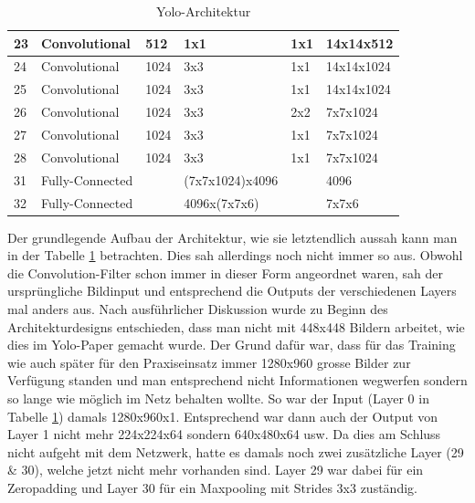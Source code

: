 \begin{table}
\begin{tabularx}{1.1\textwidth}{|l|l|l|l|l|X|}
\hline  	23	& Convolutional		& 512	& 1x1	& 1x1	& 14x14x512	\\
\hline  	24	& Convolutional		& 1024	& 3x3	& 1x1	& 14x14x1024	\\
\hline  	25	& Convolutional		& 1024	& 3x3	& 1x1	& 14x14x1024	\\
\hline  	26	& Convolutional		& 1024	& 3x3	& 2x2	& 7x7x1024	\\
\hline  	27	& Convolutional		& 1024	& 3x3	& 1x1	& 7x7x1024	\\
\hline  	28	& Convolutional		& 1024	& 3x3	& 1x1	& 7x7x1024	\\
\hline 	31	& Fully-Connected	&		&(7x7x1024)x4096	&	& 4096  \\
\hline  	32	& Fully-Connected	&		& 4096x(7x7x6)	&	& 7x7x6 \\
\hline 	
\end{tabularx}
\caption{Yolo-Architektur}
\label{tbl:yolo_architektur}
\end{table}


Der grundlegende Aufbau der Architektur, wie sie letztendlich aussah kann man in der Tabelle \ref{tbl:yolo_architektur} betrachten. 
Dies sah allerdings noch nicht immer so aus.
Obwohl die Convolution-Filter schon immer in dieser Form angeordnet waren, sah der ursprüngliche Bildinput und entsprechend die Outputs der verschiedenen Layers mal anders aus.
Nach ausführlicher Diskussion \cite{PrivateCommunication} wurde zu Beginn des Architekturdesigns entschieden, dass man nicht mit 448x448 Bildern arbeitet, wie dies im Yolo-Paper \cite{yolo} gemacht wurde.
Der Grund dafür war, dass für das Training wie auch später für den Praxiseinsatz immer 1280x960 grosse Bilder zur Verfügung standen und man entsprechend nicht Informationen \grqq{}wegwerfen\grqq{} sondern so lange wie möglich im Netz behalten wollte.
So war der Input (Layer 0 in Tabelle \ref{tbl:yolo_architektur}) damals 1280x960x1.
Entsprechend war dann auch der Output von Layer 1 nicht mehr 224x224x64 sondern 640x480x64 usw.
Da dies am Schluss nicht aufgeht mit dem Netzwerk, hatte es damals noch zwei zusätzliche Layer (29 \& 30), welche jetzt nicht mehr vorhanden sind.
Layer 29 war dabei für ein Zeropadding und Layer 30 für ein Maxpooling mit Strides 3x3 zuständig.



